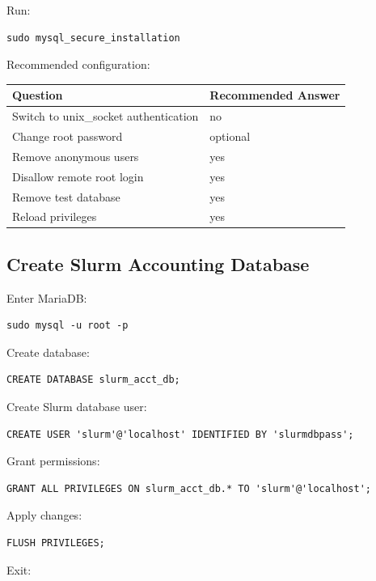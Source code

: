 \documentclass[11pt]{article}
\begin{document}
Run:

\begin{verbatim}
sudo mysql_secure_installation
\end{verbatim}

Recommended configuration:

\begin{center}
\begin{tabular}{ll}
Question & Recommended Answer\\
\hline
Switch to unix\_socket authentication & no\\
Change root password & optional\\
Remove anonymous users & yes\\
Disallow remote root login & yes\\
Remove test database & yes\\
Reload privileges & yes\\
\end{tabular}
\end{center}
\subsection{Create Slurm Accounting Database}
\label{sec:orgb07d469}

Enter MariaDB:

\begin{verbatim}
sudo mysql -u root -p
\end{verbatim}

Create database:

\begin{verbatim}
CREATE DATABASE slurm_acct_db;
\end{verbatim}

Create Slurm database user:

\begin{verbatim}
CREATE USER 'slurm'@'localhost' IDENTIFIED BY 'slurmdbpass';
\end{verbatim}

Grant permissions:

\begin{verbatim}
GRANT ALL PRIVILEGES ON slurm_acct_db.* TO 'slurm'@'localhost';
\end{verbatim}

Apply changes:

\begin{verbatim}
FLUSH PRIVILEGES;
\end{verbatim}

Exit:
\end{document}
